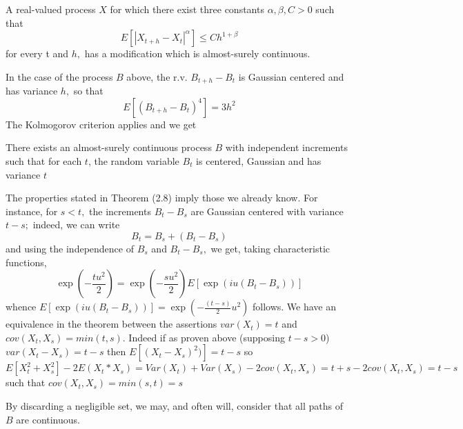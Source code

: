 \begin{theorem}
	A real-valued process $X$ for which there exist three constants $\alpha, \beta, C>0$ such that
	\[
	E\left[\left|X_{t+h}-X_{t}\right|^{\alpha}\right] \leq C h^{1+\beta}
	\]
	for every t and $h,$ has a modification which is almost-surely continuous.
\end{theorem}
In the case of the process $B$ above, the r.v. $B_{t+h}-B_{t}$ is Gaussian centered and has variance $h,$ so that
\[
E\left[\left(B_{t+h}-B_{t}\right)^{4}\right]=3 h^{2}
\]
The Kolmogorov criterion applies and we get
\begin{theorem}
	There exists an almost-surely continuous process $B$ with independent increments such that for each $t$, the random variable $B_{t}$ is centered, Gaussian and has variance $t$
\end{theorem}
The properties stated in Theorem (2.8) imply those we already know. For instance, for $s<t,$ the increments $B_{t}-B_{s}$ are Gaussian centered with variance $t-s ;$ indeed, we can write
\[
B_{t}=B_{s}+\left(B_{t}-B_{s}\right)
\]
and using the independence of $B_{s}$ and $B_{t}-B_{s},$ we get, taking characteristic functions,
\[
\exp \left(-\frac{t u^{2}}{2}\right)=\exp \left(-\frac{s u^{2}}{2}\right) E\left[\exp \left(i u\left(B_{t}-B_{s}\right)\right)\right]
\]
whence $E\left[\exp \left(i u\left(B_{t}-B_{s}\right)\right)\right]=\exp \left(-\frac{(t-s)}{2} u^{2}\right)$ follows.
We have an equivalence in the theorem  between the assertions $var(X_t)=t$ and $cov(X_t,X_s)=min(t,s)$. Indeed if as proven above (supposing $t-s>0$) $var(X_t-X_s)=t-s$  then $E[(X_t-X_s)^2)]=t-s$ so $E[X_t^2+X_s^2]-2E(X_t*X_s)=Var(X_t)+Var(X_s)-2cov(X_t,X_s)=t+s-2cov(X_t,X_s)=t-s$ such that $cov(X_t,X_s)=min(s,t)=s$

By discarding a negligible set, we may, and often will, consider that all paths of $B$ are continuous.


